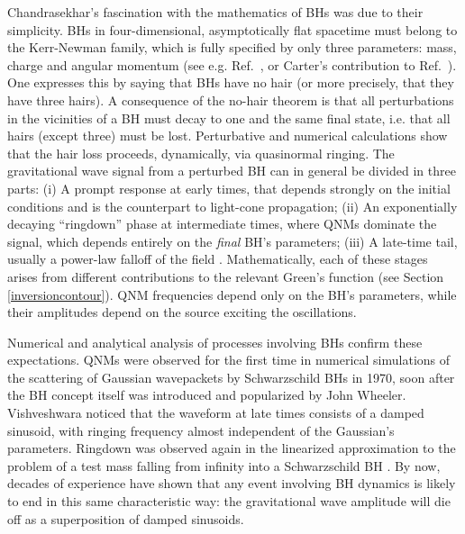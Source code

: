 \documentclass[]{iopart}
\begin{document}
Chandrasekhar's fascination with the mathematics of BHs was due to their
simplicity. BHs in four-dimensional, asymptotically flat spacetime must belong
to the Kerr-Newman family, which is fully specified by only three parameters:
mass, charge and angular momentum (see e.g. Ref.~\cite{Heusler:1998ua}, or
Carter's contribution to Ref.~\cite{Hawking:1979ig}).  One expresses this by
saying that BHs have no hair (or more precisely, that they have three
hairs). A consequence of the no-hair theorem is that all perturbations in the
vicinities of a BH must decay to one and the same final state, i.e.  that all
hairs (except three) must be lost. Perturbative and numerical calculations
show that the hair loss proceeds, dynamically, via quasinormal ringing. The
gravitational wave signal from a perturbed BH can in general be divided in
three parts: (i) A prompt response at early times, that depends strongly on
the initial conditions and is the counterpart to light-cone propagation; (ii)
An exponentially decaying ``ringdown'' phase at intermediate times, where QNMs
dominate the signal, which depends entirely on the {\it final} BH's
parameters; (iii) A late-time tail, usually a power-law falloff of the field
\cite{Ching:1995tj}. Mathematically, each of these stages arises from
different contributions to the relevant Green's function (see Section
\ref{inversioncontour}). QNM frequencies depend only on the BH's parameters,
while their amplitudes depend on the source exciting the oscillations.

Numerical and analytical analysis of processes involving BHs confirm these
expectations. QNMs were observed for the first time in numerical simulations
of the scattering of Gaussian wavepackets by Schwarzschild BHs in 1970, soon
after the BH concept itself was introduced and popularized by John
Wheeler. Vishveshwara \cite{vish} noticed that the waveform at late times
consists of a damped sinusoid, with ringing frequency almost independent of
the Gaussian's parameters. Ringdown was observed again in the linearized
approximation to the problem of a test mass falling from infinity into a
Schwarzschild BH \cite{Davis:1971gg}. By now, decades of experience have shown
that any event involving BH dynamics is likely to end in this same
characteristic way: the gravitational wave amplitude will die off as a
superposition of damped sinusoids.
\end{document}
